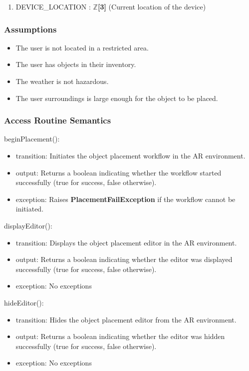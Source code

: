 \documentclass[12pt, titlepage]{article}
\begin{document}
\begin{enumerate}
  \item DEVICE\_LOCATION : $\mathbb{Z}$\textbf{[3]} (Current location of the device)
\end{enumerate}

\subsubsection{Assumptions}

\begin{itemize}
  \item The user is not located in a restricted area.
  \item The user has objects in their inventory.
  \item The weather is not hazardous.
  \item The user surroundings is large enough for the object to be placed.
\end{itemize}

\subsubsection{Access Routine Semantics}

\noindent beginPlacement():
\begin{itemize}
\item transition: Initiates the object placement workflow in the AR environment.
\item output: Returns a boolean indicating whether the workflow started successfully (true for success, false otherwise).
\item exception: Raises \textbf{PlacementFailException} if the workflow cannot be initiated.
\end{itemize}

\noindent displayEditor():
\begin{itemize}
\item transition: Displays the object placement editor in the AR environment.
\item output: Returns a boolean indicating whether the editor was displayed successfully (true for success, false otherwise).
\item exception: No exceptions
\end{itemize}

\noindent hideEditor():
\begin{itemize}
\item transition: Hides the object placement editor from the AR environment.
\item output: Returns a boolean indicating whether the editor was hidden successfully (true for success, false otherwise).
\item exception: No exceptions
\end{itemize}
\end{document}
